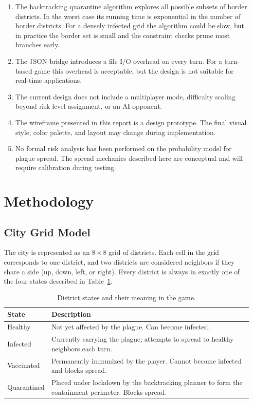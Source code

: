 \documentclass[12pt, a4paper]{article}
\begin{document}
\begin{enumerate}
  \item The backtracking quarantine algorithm explores all possible subsets
        of border districts. In the worst case its running time is
        exponential in the number of border districts. For a densely
        infected grid the algorithm could be slow, but in practice the
        border set is small and the constraint checks prune most branches
        early.
  \item The JSON bridge introduces a file I/O overhead on every turn. For
        a turn-based game this overhead is acceptable, but the design is
        not suitable for real-time applications.
  \item The current design does not include a multiplayer mode, difficulty
        scaling beyond risk level assignment, or an AI opponent.
  \item The wireframe presented in this report is a design prototype. The
        final visual style, color palette, and layout may change during
        implementation.
  \item No formal risk analysis has been performed on the probability model
        for plague spread. The spread mechanics described here are
        conceptual and will require calibration during testing.
\end{enumerate}

\section{Methodology}

\subsection{City Grid Model}

The city is represented as an $8\times8$ grid of districts. Each cell in
the grid corresponds to one district, and two districts are considered
neighbors if they share a side (up, down, left, or right). Every district
is always in exactly one of the four states described in
Table~\ref{tab:states}.

\begin{table}[ht]
\centering
\caption{District states and their meaning in the game.}
\label{tab:states}
\begin{tabularx}{\linewidth}{|l|X|}
\hline
\textbf{State} & \textbf{Description} \\
\hline
Healthy     & Not yet affected by the plague. Can become infected. \\
\hline
Infected    & Currently carrying the plague; attempts to spread to
              healthy neighbors each turn. \\
\hline
Vaccinated  & Permanently immunized by the player. Cannot become
              infected and blocks spread. \\
\hline
Quarantined & Placed under lockdown by the backtracking planner to form
              the containment perimeter. Blocks spread. \\
\hline
\end{tabularx}
\end{table}
\end{document}
